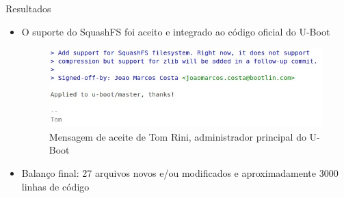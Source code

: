 \begin{frame}{Resultados}
\begin{itemize}
\item O suporte do SquashFS foi aceito e integrado ao código oficial do U-Boot
\begin{figure}
\centering
\includegraphics[scale=0.4]{figuras/tom.jpeg}
\caption{Mensagem de aceite de Tom Rini, administrador principal do U-Boot}
\end{figure}
\item Balanço final: 27 arquivos novos e/ou modificados e aproximadamente 3000 linhas de código
\end{itemize}
\end{frame}



